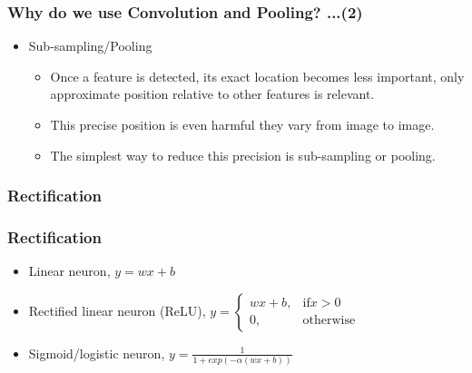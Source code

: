 \documentclass{beamer}
\begin{document}
\begin{frame}
	\frametitle{Why do we use Convolution and Pooling? ...(2)}
	\begin{itemize}
		\item Sub-sampling/Pooling
		\begin{itemize}
			\item Once a feature is detected, its exact location becomes less important, only approximate position relative to other features is relevant.
			\item This precise position is even harmful they vary from image to image.
			\item The simplest way to reduce this precision is sub-sampling or pooling.
		\end{itemize}
	\end{itemize}		  
\end{frame}

\subsubsection{Rectification}

\begin{frame}
	\frametitle{Rectification}
	\begin{itemize}
		\item Linear neuron, $ y = wx + b $
		\item Rectified linear neuron (ReLU), 
			$ y = 
			\begin{cases} 
				wx + b, & \text{if} x > 0 \\
				0, & \text{otherwise} 
			\end{cases} $
		\item Sigmoid/logistic neuron, $ y = \frac{1}{1+exp(-\alpha(wx + b))} $
		
	\end{itemize}
\begin{center}
\end{center}
\end{frame}
\end{document}
